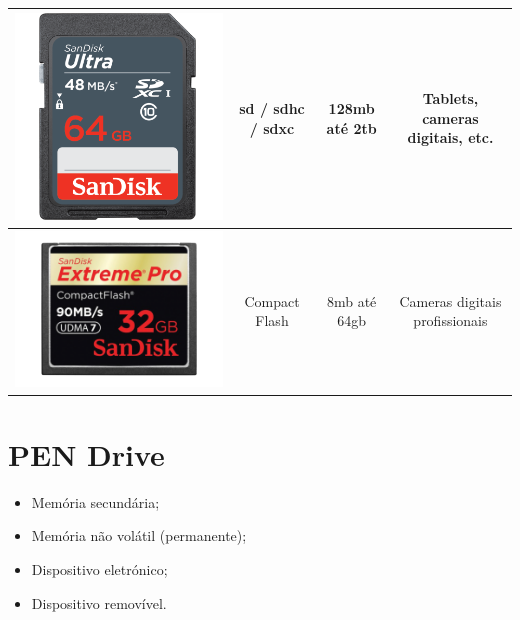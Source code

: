 \documentclass[a4paper]{report}
\begin{document}
\begin{tabular}{|c|c|c|c|}
\includegraphics[scale=0.07]{Imagens/4-5-3-1.png} & \ac{sd} / \ac{sdhc} / \ac{sdxc} & 128\ac{mb} até 2\ac{tb} & Tablets, cameras digitais, etc. \\\hline
\includegraphics[scale=0.3]{Imagens/4-5-4.png} & Compact Flash & 8\ac{mb} até 64\ac{gb} & Cameras digitais profissionais\\\hline 
\end{tabular}

\newpage

\section{PEN Drive}
\label{sect.pen}

\begin{itemize}
\item Memória secundária;
\item Memória não volátil (permanente);
\item Dispositivo eletrónico;
\item Dispositivo removível.
\end{itemize}
\end{document}
